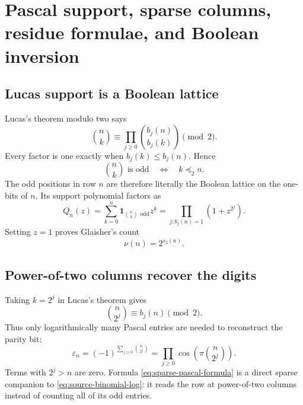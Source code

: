 \documentclass[11pt,oneside]{article}
\theoremstyle{definition}
\theoremstyle{remark}
\newcommand{\wt}{s_2}
\newcommand{\eps}{\varepsilon}
\newcommand{\submask}{\mathrel{\preccurlyeq_2}}
\newcommand{\ind}{\mathbf 1}
\begin{document}
\section{Pascal support, sparse columns, residue formulae, and Boolean inversion}
\label{sec:pascal}

\subsection{Lucas support is a Boolean lattice}

Lucas's theorem modulo two says
\begin{equation}
  \binom nk\equiv\prod_{j\ge0}\binom{b_j(n)}{b_j(k)}\pmod2. \label{eq:lucas-binary}
\end{equation}
Every factor is one exactly when \(b_j(k)\le b_j(n)\).  Hence
\begin{equation}
  \binom nk\text{ is odd}\quad\Longleftrightarrow\quad k\submask n.             \label{eq:odd-submask}
\end{equation}
The odd positions in row \(n\) are therefore literally the Boolean lattice on the one-bits
of \(n\).  Its support polynomial factors as
\begin{equation}
  Q_n(z)=\sum_{k=0}^{n}\ind_{\binom nk\text{ odd}}z^k
        =\prod_{j:b_j(n)=1}(1+z^{2^j}).                     \label{eq:row-support-polynomial}
\end{equation}
Setting \(z=1\) proves Glaisher's count
\begin{equation}
  \boxed{\nu(n)=2^{\wt(n)}.}                                \label{eq:glaisher-count}
\end{equation}

\subsection{Power-of-two columns recover the digits}

Taking \(k=2^j\) in Lucas's theorem gives
\begin{equation}
  \binom{n}{2^j}\equiv b_j(n)\pmod2.                        \label{eq:power-column-digit}
\end{equation}
Thus only logarithmically many Pascal entries are needed to reconstruct the parity bit:
\begin{equation}
  \boxed{
  \eps_n=(-1)^{\sum_{j\ge0}\binom{n}{2^j}}
  =\prod_{j\ge0}\cos\!\left(\pi\binom{n}{2^j}\right).}    \label{eq:sparse-pascal-formula}
\end{equation}
Terms with \(2^j>n\) are zero.  Formula \eqref{eq:sparse-pascal-formula} is a direct sparse
companion to \eqref{eq:source-binomial-log}: it reads the row at power-of-two columns instead
of counting all of its odd entries.
\end{document}
